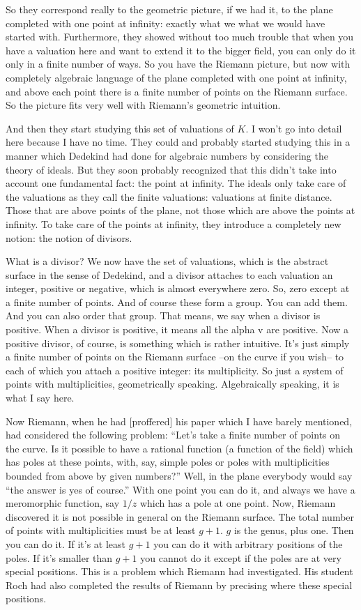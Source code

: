 \documentclass{article}
\begin{document}
So they correspond really to the geometric picture,
if we had it,
to the plane completed with one point at infinity:
exactly what we what we would have started with.
Furthermore, they showed without too much trouble 
that when you have a valuation here 
and want to extend it to the bigger field,
you can only do it only in a finite number of ways.
So you have the Riemann picture,
but now with completely algebraic language
of the plane completed with one point at infinity,
and above each point there is a finite number of points 
on the Riemann surface.
So the picture fits very well with Riemann's geometric intuition.

And then they start studying this set of valuations of $K$.
I won't go into detail here because I have no time.
They could and probably started studying this 
in a manner which Dedekind had done for algebraic numbers 
by considering the theory of ideals.
But they soon probably recognized 
that this didn't take into account one fundamental fact:
the point at infinity.
The ideals only take care of the valuations 
as they call the finite valuations: 
valuations at finite distance. 
Those that are above points of the plane,
not those which are above the points at infinity.
To take care of the points at infinity, 
they introduce a completely new notion: 
the notion of divisors.

What is a divisor?
We now have the set of valuations, 
which is the abstract surface in the sense of Dedekind,
and a divisor attaches to each valuation an integer,
positive or negative,
which is almost everywhere zero.
So, zero except at a finite number of points.
And of course these form a group.
You can add them.
And you can also order that group.
That means, we say when a divisor is positive.
When a divisor is positive, it means all the alpha v are positive.
Now a positive divisor, of course, is something which is rather intuitive.
It's just simply a finite number of points 
on the Riemann surface 
--on the curve if you wish--
to each of which you attach a positive integer: its multiplicity.
So just a system of points with multiplicities,
geometrically speaking.
Algebraically speaking, it is what I say here.

Now Riemann, when he had [proffered] his paper
which I have barely mentioned,
had considered the following problem:
``Let's take a finite number of points on the curve.
Is it possible to have a rational function
(a function of the field)
which has poles at these points,
with, say, simple poles 
or poles with multiplicities 
bounded from above by given numbers?''
Well, in the plane everybody would say ``the answer is yes of course.''
With one point you can do it,
and always we have a meromorphic function, say $1/z$ 
which has a pole at one point.
Now, Riemann discovered it is not possible in general 
on the Riemann surface.
The total number of points with multiplicities must be at least $g+1$.
$g$ is the genus, plus one.
Then you can do it. 
If it's at least $g+1$ you can do it 
with arbitrary positions of the poles.
If it's smaller than $g+1$ you cannot do it 
except if the poles are at very special positions.
This is a problem which Riemann had investigated.
His student Roch had also completed the results of Riemann 
by precising where these special positions.
\end{document}
